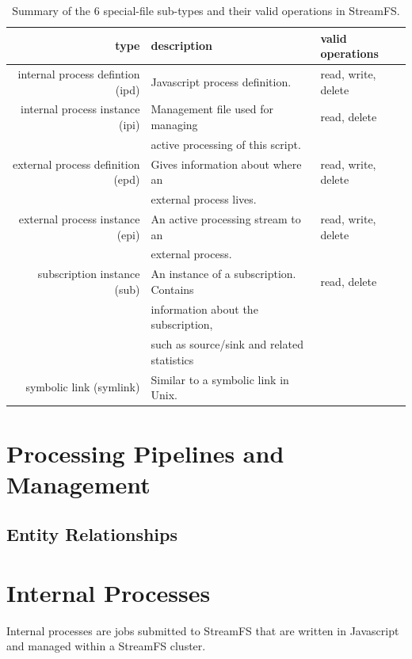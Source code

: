 \begin{table}[h]
\begin{center}
\begin{tabular}{| r | l | l |}
	\hline
	\textbf{type} & \textbf{description} & \textbf{valid operations} \\ \hline
	internal process defintion (ipd) & Javascript process definition.  & read, write, delete  \\ \hline

	internal process instance (ipi) & Management file used for managing & read, delete \\
							  & active processing of this script. & \\ \hline

	external process definition (epd) & Gives information about where an & read, write, delete \\
								& external process lives. &\\ \hline

	external process instance (epi) & An active processing stream to an  & read, write, delete \\
								& external process. &\\ \hline

	subscription instance (sub) & An instance of a subscription.  Contains & read, delete \\
								& information about the subscription, &\\
								& such as source/sink and related statistics &\\ \hline
	symbolic link (symlink) & Similar to a symbolic link in Unix. & \\
	\hline
\end{tabular}
\caption{Summary of the 6 special-file sub-types and their valid operations in StreamFS.}
\label{tab:filesubtypes}
\end{center}
\end{table}




\section{Processing Pipelines and Management}
	\subsection{Entity Relationships}

\section{Internal Processes}
Internal processes are jobs submitted to StreamFS that are written in Javascript and managed within a StreamFS cluster.


